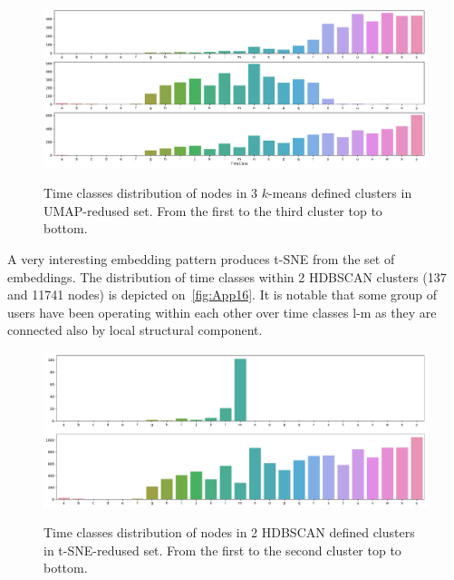 \begin{figure}[!ht]
	\centering
	\includegraphics[width=1.0\textwidth]{images/appendix/App15.pdf}\\
	\caption{Time classes distribution of nodes in 3 $k$-means defined clusters in UMAP-redused set. From the first to the third cluster top to bottom.}
	\label{fig:App15}
\end{figure}

A very interesting embedding pattern produces t-SNE from the set of embeddings. The distribution of time classes within 2 HDBSCAN clusters (137 and 11741 nodes) is depicted on~\autoref{fig:App16}. It is notable that some group of users have been operating within each other over time classes l-m as they are connected also by local structural component.

\begin{figure}[!ht]
	\centering
	\includegraphics[width=1.0\textwidth]{images/appendix/App16.pdf}\\
	\caption{Time classes distribution of nodes in 2 HDBSCAN defined clusters in t-SNE-redused set. From the first to the second cluster top to bottom.}
	\label{fig:App16}
\end{figure}
